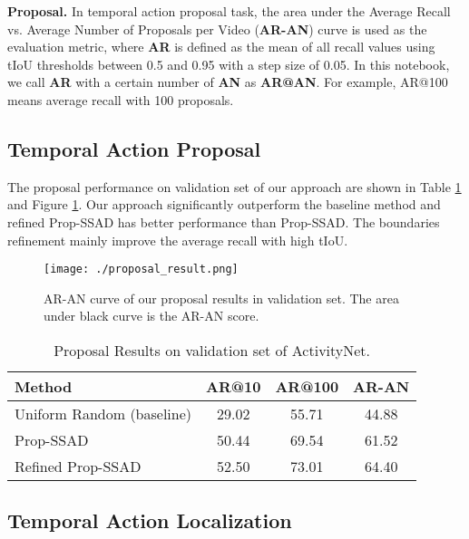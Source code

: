 \documentclass[10pt,twocolumn,letterpaper]{article}
\begin{document}
{\bf Proposal.} In temporal action proposal task,  the area under the Average Recall vs. Average Number of Proposals per Video ({\bf AR-AN}) curve is used as the evaluation metric, where {\bf AR} is defined as the mean of all recall values using tIoU thresholds between 0.5 and 0.95 with a step size of 0.05. In this notebook, we call {\bf AR} with a certain number of  {\bf AN} as {\bf AR@AN}. For example, AR@100 means average recall with 100 proposals.


\subsection{Temporal Action Proposal}

The proposal performance on validation set of our approach are shown in Table \ref{result_proposal} and Figure \ref{result_proposal_img}. Our approach significantly outperform the baseline method and refined Prop-SSAD has better performance than Prop-SSAD. The boundaries refinement mainly improve the average recall with high tIoU. 

\begin{figure}[tbp]
\centering
\begin{minipage}[b]{1.0\linewidth}
  \centering
  \centerline{\texttt{[image: ./proposal\_result.png]}}
\medskip
\end{minipage}
\caption{AR-AN curve of our proposal results in validation set. The area under black curve is the AR-AN score.
}
\label{result_proposal_img}
\end{figure}

\begin{table}[!tbp]

\centering
\caption{Proposal Results on validation set of ActivityNet.}
\small
\begin{tabular}{p{3cm}<{\centering}ccc<{\centering}}
\toprule
Method  & AR@10 & AR@100  & AR-AN  \\
\midrule Uniform Random (baseline)  & 29.02 & 55.71 & 44.88 \\
Prop-SSAD  & 50.44 & 69.54 & 61.52 \\
Refined Prop-SSAD & 52.50 & 73.01 & 64.40 \\
\bottomrule
\end{tabular}
\label{result_proposal}
\normalsize
\end{table}




\subsection{Temporal Action Localization}
\end{document}
